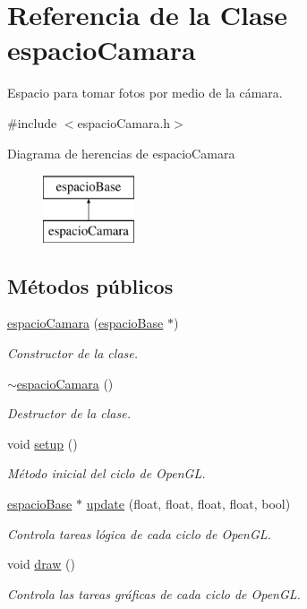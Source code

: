 \hypertarget{classespacio_camara}{}\section{Referencia de la Clase espacio\+Camara}
\label{classespacio_camara}


Espacio para tomar fotos por medio de la cámara.  




{\ttfamily \#include $<$espacio\+Camara.\+h$>$}

Diagrama de herencias de espacio\+Camara\begin{figure}[H]
\begin{center}
\leavevmode
\includegraphics[height=2.000000cm]{classespacio_camara}
\end{center}
\end{figure}
\subsection*{Métodos públicos}
\begin{DoxyCompactItemize}
\item 
\hyperlink{classespacio_camara_adf85b2cd673cb9eafee260e14b9c9f41}{espacio\+Camara} (\hyperlink{classespacio_base}{espacio\+Base} $\ast$)
\begin{DoxyCompactList}\small\item\em Constructor de la clase. \end{DoxyCompactList}\item 
\hyperlink{classespacio_camara_aa6ac19fb18722f62697bfe43b1b171ce}{$\sim$espacio\+Camara} ()
\begin{DoxyCompactList}\small\item\em Destructor de la clase. \end{DoxyCompactList}\item 
void \hyperlink{classespacio_camara_af9b840498c705d9fe3ca8e363b4a535b}{setup} ()
\begin{DoxyCompactList}\small\item\em Método inicial del ciclo de Open\+G\+L. \end{DoxyCompactList}\item 
\hyperlink{classespacio_base}{espacio\+Base} $\ast$ \hyperlink{classespacio_camara_a133e544d5bb6015e3d9e6eff4a6d812d}{update} (float, float, float, float, bool)
\begin{DoxyCompactList}\small\item\em Controla tareas lógica de cada ciclo de Open\+G\+L. \end{DoxyCompactList}\item 
void \hyperlink{classespacio_camara_a2c3d027a3787a226e00aab10c93f1bbe}{draw} ()
\begin{DoxyCompactList}\small\item\em Controla las tareas gráficas de cada ciclo de Open\+G\+L. \end{DoxyCompactList}\end{DoxyCompactItemize}
